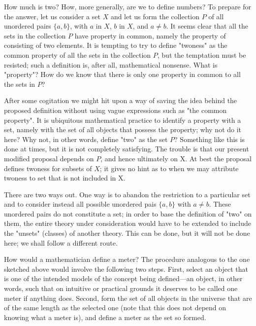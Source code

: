 How much is two? How, more generally, are we to define numbers? To prepare for the answer, let us consider a set $X$ and let us form the collection $P$ of all unordered pairs $\{ a, b \}$, with $a$ in $X$, $b$ in $X$, and $a \neq b$. It seems clear that all the sets in the collection $P$ have property in common, namely the property of consisting of two elements. It is tempting to try to define "twoness" as the common property of all the sets in the collection $P$, but the temptation must be resisted; such a definition is, after all, mathematical nonsense. What is "property"? How do we know that there is only one property in common to all the sets in $P$? 

After some cogitation we might hit upon a way of saving the idea behind the proposed definition without using vague expressions such as "the common property". It is ubiquitous  mathematical  practice to identify a property with a set, namely with the set of all objects that possess the property; why not do it here? Why not, in other words, define "two" as the set $P$? Something like this is done at times, but it is not completely satisfying. The trouble is that our present modified proposal depends on $P$, and hence ultimately on X. At best the proposal defines twoness for subsets of $X$; it gives no hint as to when we may attribute twoness to set that is not included in X. 

There are two ways out. One way is to abandon the restriction to a particular set and to consider instead all possible unordered pais $\{ a, b \}$ with $a \neq b$. These unordered pairs do not constitute a set; in order to base the definition of "two" on them, the entire theory under consideration would have to be extended to include the "unsets" (classes) of another theory. This can be done, but it will not be done here; we shall follow a different route. 

How would a mathematician define a meter? The procedure analogous to the one sketched above would involve the following two steps. First, select an object that is one of the intended models of the concept being defined—an object, in other words, such that on intuitive or practical grounds it deserves to be called one meter if anything does. Second, form the set of all objects in the universe that are of the same length as the selected one (note that this does not depend on knowing what a meter is), and define a meter as the set so formed. 

